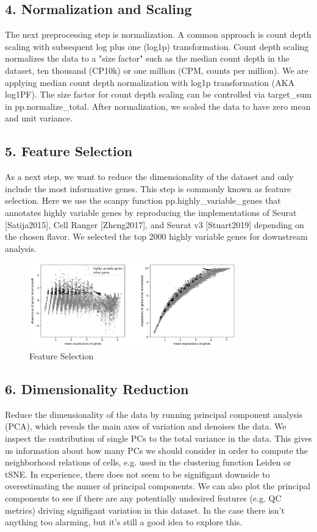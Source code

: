 \documentclass[12pt]{article}
\begin{document}
\subsection{4. Normalization and Scaling}
The next preprocessing step is normalization. A common approach is count depth scaling with subsequent log plus one (log1p) transformation. Count depth scaling normalizes the data to a "size factor" such as the median count depth in the dataset, ten thousand (CP10k) or one million (CPM, counts per million). We are applying median count depth normalization with log1p transformation (AKA log1PF). The size factor for count depth scaling can be controlled via target\_sum in pp.normalize\_total. After normalization, we scaled the data to have zero mean and unit variance.

\subsection{5. Feature Selection}
As a next step, we want to reduce the dimensionality of the dataset and only include the most informative genes. This step is commonly known as feature selection. Here we use the scanpy function pp.highly\_variable\_genes that annotates highly variable genes by reproducing the implementations of Seurat [Satija2015], Cell Ranger [Zheng2017], and Seurat v3 [Stuart2019] depending on the chosen flavor. We selected the top 2000 highly variable genes for downstream analysis.

\begin{figure}[H]
    \centering
    \includegraphics[width=0.8\textwidth]{highly_variable_genes.png}
    \caption{Feature Selection}
    \label{fig:highly_variable_genes}
\end{figure}

\subsection{6. Dimensionality Reduction}
Reduce the dimensionality of the data by running principal component analysis (PCA), which reveals the main axes of variation and denoises the data. We inspect the contribution of single PCs to the total variance in the data. This gives us information about how many PCs we should consider in order to compute the neighborhood relations of cells, e.g. used in the clustering function Leiden or tSNE. In experience, there does not seem to be signifigant downside to overestimating the numer of principal components. We can also plot the principal components to see if there are any potentially undesired features (e.g. QC metrics) driving signifigant variation in this dataset. In the case there isn't anything too alarming, but it's still a good idea to explore this.
\end{document}
